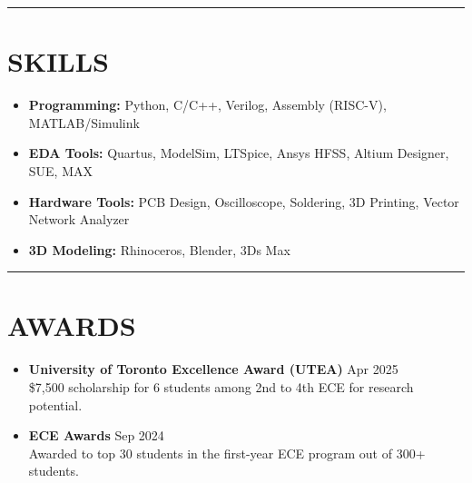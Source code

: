 \documentclass[letterpaper,10pt]{article}
\begin{document}
\noindent\rule{\linewidth}{1pt}

\section*{\textbf{SKILLS}}
\begin{itemize}[leftmargin=0.2in]
    \item \textbf{Programming:} Python, C/C++, Verilog, Assembly (RISC-V), MATLAB/Simulink
    \item \textbf{EDA Tools:} Quartus, ModelSim, LTSpice, Ansys HFSS, Altium Designer, SUE, MAX
    \item \textbf{Hardware Tools:} PCB Design, Oscilloscope, Soldering, 3D Printing, Vector Network Analyzer
    \item \textbf{3D Modeling:} Rhinoceros, Blender, 3Ds Max
\end{itemize}

\noindent\rule{\linewidth}{1pt}

\section*{\textbf{AWARDS}}

\begin{itemize}[leftmargin=0.2in]
	\item \textbf{University of Toronto Excellence Award (UTEA)} \hfill Apr 2025\\
    \$7,500 scholarship for 6 students among 2nd to 4th ECE for research potential.
	\item \textbf{ECE Awards} \hfill Sep 2024\\
	Awarded to top 30 students in the first-year ECE program out of 300+ students.
\end{itemize}
\end{document}
